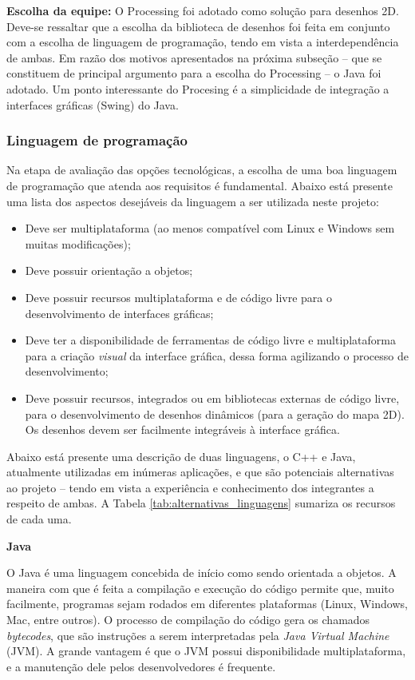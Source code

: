 \textbf{Escolha da equipe:} O Processing foi adotado como solução para desenhos 2D. Deve-se ressaltar que a escolha da biblioteca de desenhos foi feita em conjunto com a escolha de linguagem de programação, tendo em vista a interdependência de ambas. Em razão dos motivos apresentados na próxima subseção -- que se constituem de principal argumento para a escolha do Processing -- o Java foi adotado. Um ponto interessante do Procesing é a simplicidade de integração a interfaces gráficas (Swing) do Java.

\subsubsection{Linguagem de programação}

Na etapa de avaliação das opções tecnológicas, a escolha de uma boa linguagem de programação que atenda aos requisitos é fundamental. Abaixo está presente uma lista dos aspectos desejáveis da linguagem a ser utilizada neste projeto:

\begin{itemize}
  \item Deve ser multiplataforma (ao menos compatível com Linux e Windows sem muitas modificações);
  \item Deve possuir orientação a objetos;
  \item Deve possuir recursos multiplataforma e de código livre para o desenvolvimento de interfaces gráficas;
  \item Deve ter a disponibilidade de ferramentas de código livre e multiplataforma para a criação \textit{visual} da interface gráfica, dessa forma agilizando o processo de desenvolvimento;
  \item Deve possuir recursos, integrados ou em bibliotecas externas de código livre, para o desenvolvimento de desenhos dinâmicos (para a geração do mapa 2D). Os desenhos devem ser facilmente integráveis à interface gráfica.
\end{itemize}


Abaixo está presente uma descrição de duas linguagens, o C++ e Java, atualmente utilizadas em inúmeras aplicações, e que são potenciais alternativas ao projeto -- tendo em vista a experiência e conhecimento dos integrantes a respeito de ambas. A Tabela \ref{tab:alternativas_linguagens} sumariza os recursos de cada uma.

\textbf{Java}

O Java \cite{java} é uma linguagem concebida de início como sendo orientada a objetos. A maneira com que é feita a compilação e execução do código permite que, muito facilmente, programas sejam rodados em diferentes plataformas (Linux, Windows, Mac, entre outros). O processo de compilação do código gera os chamados \textit{bytecodes}, que são instruções a serem interpretadas pela \textit{Java Virtual Machine} (JVM). A grande vantagem é que o JVM possui disponibilidade multiplataforma, e a manutenção dele pelos desenvolvedores é frequente.

